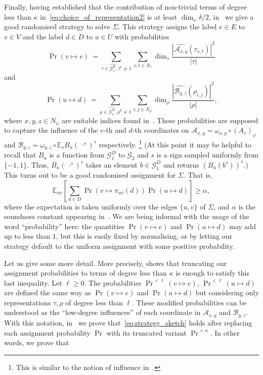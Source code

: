 \documentclass[a4paper,11pt]{article}
\theoremstyle{definition}
\newcommand{\ex}[1]{\mathbb{E}_{#1}}
\newcommand{\gr}{\mathscr{G}}
\newcommand{\A}{\mathcal{A}}
\newcommand{\B}{\mathcal{B}}
\begin{document}
Finally, having established that the contribution of non-trivial terms of degree less than $\kappa$ in~\eqref{eq:choice_of_representation2} is at least $\dim_\omega\delta/2$,  in~ we give a good randomised strategy to solve $\Sigma$. This strategy assigns the label $e\in E$ 
to $v\in V$ and the label $d\in D$ to $u\in U$ with probabilities
\begin{equation*}
\Pr(v\mapsto e) \ = 
\sum_{\tau \in \widehat{\gr_1^E}, \tau^e\neq 1}
\sum_{s,t\in N_\tau} \dim_\tau\frac{\left\vert \widehat{\A_{x,y}}(\tau_{s,t})\right\vert^2}{|\tau|}
\end{equation*}
and
\begin{equation*}
\Pr(u \mapsto d)\ = 
\sum_{\rho \in \widehat{\gr_1^D}, \rho^d\neq 1}
\sum_{i,j\in N_\rho} \dim_\rho \frac{\left\vert \widehat{\B_{y,z}}(\rho_{i,j})\right\vert^2}{|\rho|},
\end{equation*}
where $x,y,z\in N_\omega$ are suitable indices found in~. 
These probabilities are supposed to capture the influence of the $e$-th and
$d$-th coordinates on $\A_{x,y}= \omega_{x,y}\circ (A_v)_\varphi$ and
$\B_{y,z}=\omega_{y,z}\circ \ex{s}B_u( \ \cdot^s)^s$ respectively.
\footnote{This is similar to the notion of influence
in~\cite{Bhangale21:stoc,Austrin09:cc}.}
(At this point it may be helpful to recall that $B_u$ is a function from
$\gr_1^D$ to $\gr_2$ and $s$ is a sign sampled uniformly from $\{-1,1\}$. Thus,
$B_u(\ \cdot^s)^s$ takes an element $b\in\gr_1^D$ and returns $(B_u(b^s))^s$.)
This turns out to be a good randomised assignment for $\Sigma$. That is, 
\begin{equation}
\label{eq:strategy_sketch}
\ex{uv}\left[
\sum_{d\in D}
\Pr(v\mapsto \pi_{uv}(d)) \Pr(u\mapsto d)
\right] \geq \alpha,
\end{equation}
where the expectation is taken uniformly over the edges $\{u,v\}$ of $\Sigma$, and $\alpha$ is the soundness constant appearing in~. We are being informal with the usage of the word ``probability'' here: the quantities $\Pr(v\mapsto e)$ and
$\Pr(u \mapsto d)$ may add up to less than $1$, but this is easily fixed by normalising, or by letting our strategy default to the uniform assignment with some positive probability. \par
Let us give some more detail. More precisely,  shows that truncating our assignment probabilities to terms of degree less than $\kappa$ is enough to satisfy this last inequality. Let $\ell\geq 0$. The probabilities $\Pr^{<\ell}(v\mapsto e)$, $\Pr^{<\ell}(u\mapsto d)$ are defined the same way as $\Pr(v\mapsto e)$ and $\Pr(u\mapsto d)$
but considering only representations $\tau, \rho$
of degree less than $\ell$. These modified probabilities can be understood as the ``low-degree influences'' of each coordinate in $\A_{x,y}$ and $\B_{y,z}$. With this notation, in~ we prove that~\eqref{eq:strategy_sketch} holds after replacing 
each assignment probability $\Pr$ with its truncated variant $\Pr^{<\kappa}$. In other words, we prove that
\end{document}
